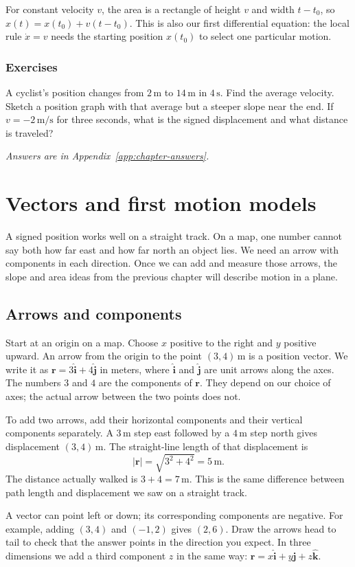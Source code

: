 \documentclass[11pt,oneside]{book}
\newcommand{\vect}[1]{\boldsymbol{#1}}
\theoremstyle{reviewstyle}
\newcommand{\learningcheck}[1]{\subsection*{Exercises}\noindent #1\par\smallskip\noindent\emph{Answers are in Appendix~\ref{app:chapter-answers}.}}
\begin{document}
For constant velocity $v$, the area is a rectangle of height $v$ and width $t-t_0$, so $x(t)=x(t_0)+v(t-t_0)$. This is also our first differential equation: the local rule $\dot x=v$ needs the starting position $x(t_0)$ to select one particular motion.

\learningcheck{A cyclist's position changes from $2\,\mathrm m$ to $14\,\mathrm m$ in $4\,\mathrm s$. Find the average velocity. Sketch a position graph with that average but a steeper slope near the end. If $v=-2\,\mathrm{m/s}$ for three seconds, what is the signed displacement and what distance is traveled?}

\chapter{Vectors and first motion models}
A signed position works well on a straight track. On a map, one number cannot say both how far east and how far north an object lies. We need an arrow with components in each direction. Once we can add and measure those arrows, the slope and area ideas from the previous chapter will describe motion in a plane.

\section{Arrows and components}
Start at an origin on a map. Choose $x$ positive to the right and $y$ positive upward. An arrow from the origin to the point $(3,4)\,\mathrm m$ is a position vector. We write it as $\vect r=3\hat{\vect i}+4\hat{\vect j}$ in meters, where $\hat{\vect i}$ and $\hat{\vect j}$ are unit arrows along the axes. The numbers $3$ and $4$ are the components of $\vect r$. They depend on our choice of axes; the actual arrow between the two points does not.

To add two arrows, add their horizontal components and their vertical components separately. A $3\,\mathrm m$ step east followed by a $4\,\mathrm m$ step north gives displacement $(3,4)\,\mathrm m$. The straight-line length of that displacement is
\begin{equation}
|\vect r|=\sqrt{3^2+4^2}=5\,\mathrm m.
\end{equation}
The distance actually walked is $3+4=7\,\mathrm m$. This is the same difference between path length and displacement we saw on a straight track.

A vector can point left or down; its corresponding components are negative. For example, adding $(3,4)$ and $(-1,2)$ gives $(2,6)$. Draw the arrows head to tail to check that the answer points in the direction you expect. In three dimensions we add a third component $z$ in the same way: $\vect r=x\hat{\vect i}+y\hat{\vect j}+z\hat{\vect k}$.
\end{document}
